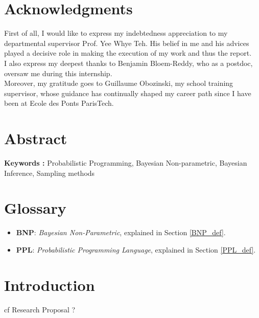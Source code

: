 \documentclass[twoside,10pt,openany,a4paper]{rapport}
\begin{document}
\chapter{Acknowledgments}

\quad First of all, I would like to express my indebtedness appreciation to my departmental supervisor Prof. Yee Whye Teh. His belief in me and his advices played a decisive role in making the execution of my work and thus the report. \\

I also express my deepest thanks to Benjamin Bloem-Reddy, who as a postdoc, oversaw me during this internship. \\

Moreover, my gratitude goes to Guillaume Obozinski, my school training supervisor, whose guidance has continually shaped my career path since I have been at Ecole des Ponts ParisTech.

\chapter{Abstract}


\textbf{Keywords :} Probabilistic Programming, Bayesian Non-parametric, Bayesian Inference, Sampling methods


\tableofcontents
{}
\listoffigures
{}

\chapter{Glossary}

\begin{itemize} 
\item \textbf{BNP}:  \textit{Bayesian Non-Parametric}, explained in Section \ref{BNP_def}. \\
\item \textbf{PPL}:  \textit{Probabilistic Programming Language}, explained in Section \ref{PPL_def}. \\

\end{itemize}

\mainmatter


\chapter{Introduction}
cf Research Proposal ?
\end{document}

